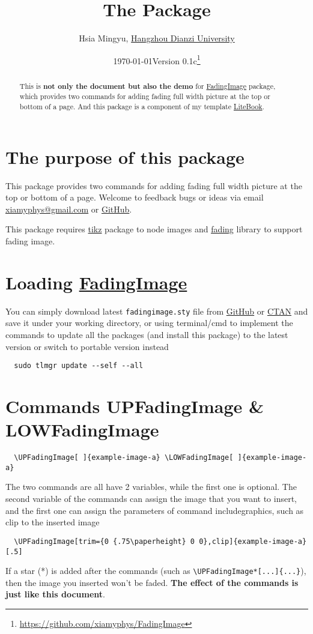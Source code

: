 \documentclass[11pt]{article}
\title{\bfseries The \pkg{FadingImage} Package}
\author{Hsia Mingyu, \href{https://www.hdu.edu.cn}{Hangzhou Dianzi University}}
\affil{\href{mailto:xiamyphys@gmail.com}{\ttfamily xiamyphys@gmail.com}}
\date{\today\quad Version 0.1c\thanks{\url{https://github.com/xiamyphys/FadingImage}}}
\def\pkg#1{\texorpdfstring{\textcolor{pkgcolor}{
    \href{https://ctan.org/pkg/#1}{\textsf{#1}}}}{“#1”}}
\def\cmd#1{\texorpdfstring{\textcolor{cmdcolor}{\textsf{#1}}}{“#1”}}
\begin{document}
\maketitle
{}

\vspace{-6ex}
\begin{abstract}
This is \textsf{\textbf{not only the document but also the demo}} for \pkg{FadingImage} package, which provides two commands for adding fading full width picture at the top or bottom of a page. And this package is a component of my template \pkg{LiteBook}.
\end{abstract}

\section{The purpose of this package}
This package provides two commands for adding fading full width picture at the top or bottom of a page. Welcome to feedback bugs or ideas via email \href{mailto:xiamyphys@gmail.com}{\ttfamily xiamyphys@gmail.com} or \href{https://github.com/xiamyphys/fadingimage}{GitHub}.

This package requires \pkg{tikz} package to node images and \pkg{fading} library to support fading image.

\section{Loading \pkg{FadingImage}}
You can simply download latest \verb|fadingimage.sty| file from \href{https://github.com/xiamyphys/FadingImage}{GitHub} or \href{https://ctan.org/pkg/fadingimage}{CTAN} and save it under your working directory, or using terminal/cmd to implement the commands to update all the packages (and install this package) to the latest version or switch to portable version instead
\begin{verbatim}
  sudo tlmgr update --self --all
\end{verbatim}

\section{Commands \cmd{UPFadingImage} \& \cmd{LOWFadingImage}}
\begin{verbatim}
  \UPFadingImage[ ]{example-image-a} \LOWFadingImage[ ]{example-image-a}
\end{verbatim}

The two commands are all have 2 variables, while the first one is optional. The second variable of the commands can assign the image that you want to insert, and the first one can assign the parameters of command \cmd{includegraphics}, such as clip to the inserted image
\begin{verbatim}
  \UPFadingImage[trim={0 {.75\paperheight} 0 0},clip]{example-image-a}[.5]
\end{verbatim}

If a star (*) is added after the commands (such as \verb|\UPFadingImage*[...]{...}|), then the image you inserted won't be faded. \textbf{\textsf{The effect of the commands is just like this document}}.
\end{document}
